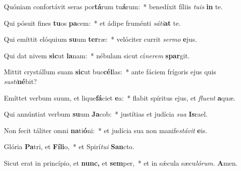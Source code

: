 \item Quóniam confortávit seras por\textbf{tá}rum tu\textbf{á}rum:~* benedíxit fíliis \textit{tuis} \textbf{in} te.
\item Qui pósuit fines \textbf{tu}os \textbf{pa}cem:~* et ádipe fruménti \textit{sáti}\textbf{at} te.
\item Qui emíttit elóquium \textbf{su}um \textbf{ter}ræ:~* velóciter currit \textit{sermo} \textbf{e}jus.
\item Qui dat nivem \textbf{sic}ut \textbf{la}nam:~* nébulam sicut cí\textit{nerem} \textbf{spar}git.
\item Mittit crystállum suam \textbf{sic}ut buc\textbf{cél}las:~* ante fáciem frígoris ejus quis \textit{susti}\textbf{né}bit?
\item Emíttet verbum suum, et lique\textbf{fá}ciet \textbf{e}a:~* flabit spíritus ejus, et \textit{fluent} \textbf{a}quæ.
\item Qui annúntiat verbum \textbf{su}um \textbf{Ja}cob:~* justítias et judícia \textit{sua} \textbf{Is}rael.
\item Non fecit táliter omni \textbf{na}ti\textbf{ó}ni:~* et judícia sua non manife\textit{stávit} \textbf{e}is.
\item Glória \textbf{Pa}tri, et \textbf{Fíli}o,~* et Spirí\tinyhspace\textit{tui} \textbf{San}cto.
\item Sicut erat in princípio, et \textbf{nunc,} et \textbf{sem}per,~* et in sǽcula sæcu\tinyhspace\textit{lórum.} \textbf{A}men.
